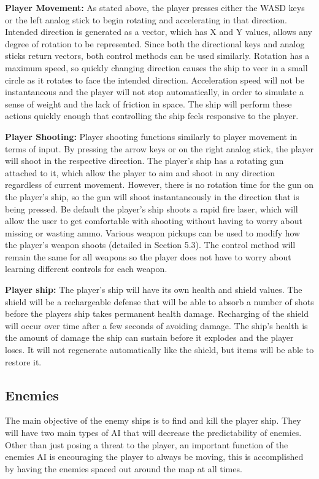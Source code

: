 \documentclass[12pt]{article}       %
\def\hs{\hspace{15pt}}
\begin{document}
	{\bf Player Movement:}	As stated above, the player presses either the WASD keys or the left analog stick to begin rotating and accelerating in that direction. Intended direction is generated as a vector, which has X and Y values, allows any degree of rotation to be represented. Since both the directional keys and analog sticks return vectors, both control methods can be used similarly. Rotation has a maximum speed, so quickly changing direction causes the ship to veer in a small circle as it rotates to face the intended direction. Acceleration speed will not be instantaneous and the player will not stop automatically, in order to simulate a sense of weight and the lack of friction in space. The ship will perform these actions quickly enough that controlling the ship feels responsive to the player. 

	{\bf Player Shooting:} Player shooting functions similarly to player movement in terms of input. By pressing the arrow keys or on the right analog stick, the player will shoot in the respective direction. The player's ship has a rotating gun attached to it, which allow the player to aim and shoot in any direction regardless of current movement. However, there is no rotation time for the gun on the player's ship, so the gun will shoot instantaneously in the direction that is being pressed. Be default the player's ship shoots a rapid fire laser, which will allow the user to get comfortable with shooting without having to worry about missing or wasting ammo. Various weapon pickups can be used to modify how the player's weapon shoots (detailed in Section 5.3). The control method will remain the same for all weapons so the player does not have to worry about learning different controls for each weapon.

	{\bf Player ship:} The player's ship will have its own health and shield values. The shield will be a rechargeable defense that will be able to absorb a number of shots before the players ship takes permanent health damage. Recharging of the shield will occur over time after a few seconds of avoiding damage. The ship's health is the amount of damage the ship can sustain before it explodes and the player loses. It will not regenerate automatically like the shield, but items will be able to restore it.

\subsection{Enemies} %

\hs The main objective of the enemy ships is to find and kill the player ship. They will have two main types of AI that will decrease the predictability of enemies. Other than just posing a threat to the player, an important function of the enemies AI is encouraging the player to always be moving, this is accomplished by having the enemies spaced out around the map at all times. \\
\end{document}
